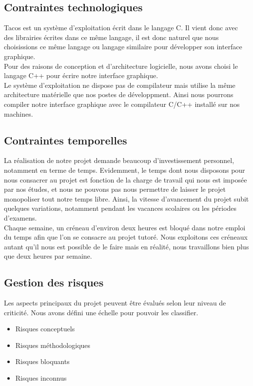 
\subsection{Contraintes technologiques}

Tacos est un système d'exploitation écrit dans le langage C. Il vient donc avec des librairies écrites dans ce même langage, il est donc naturel que nous choisissions ce même langage ou langage similaire pour développer son interface graphique. \\

Pour des raisons de conception et d'architecture logicielle, nous avons choisi le langage C++ pour écrire notre interface graphique. \\
Le système d'exploitation ne dispose pas de compilateur mais utilise la même architecture matérielle que nos postes de développment. Ainsi nous pourrons compiler notre interface graphique avec le compilateur C/C++ installé sur nos machines.

\subsection{Contraintes temporelles}

La réalisation de notre projet demande beaucoup d'investissement personnel, notamment en terme de temps. Evidemment, le temps dont nous disposons pour nous consacrer au projet est fonction de la charge de travail qui nous est imposée par nos études, et nous ne pouvons pas nous permettre de laisser le projet monopoliser tout notre temps libre. Ainsi, la vitesse d'avancement du projet subit quelques variations, notamment pendant les vacances scolaires ou les périodes d'examens. \\

Chaque semaine, un créneau d'environ deux heures est bloqué dans notre emploi du temps afin que l'on se consacre au projet tutoré. Nous exploitons ces créneaux autant qu'il nous est possible de le faire mais en réalité, nous travaillons bien plus que deux heures par semaine.
\subsection{Gestion des risques}
  Les aspects principaux du projet peuvent être évalués selon leur niveau de criticité. Nous avons défini une échelle pour pouvoir les classifier.
  \begin{itemize}
    \item Risques conceptuels
    \item Risques méthodologiques
    \item Risques bloquants
    \item Risques inconnus
  \end{itemize}
